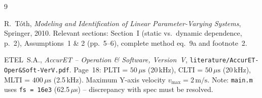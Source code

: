 \documentclass[11pt]{article}
\begin{document}
\begin{thebibliography}{9}

R.~Tóth,
\textit{Modeling and Identification of Linear Parameter-Varying Systems},
Springer, 2010.
Relevant sections: Section~I (static vs.\ dynamic dependence, p.~2),
Assumptions~1 \& 2 (pp.~5--6), complete method eq.~9a and footnote~2.

ETEL~S.A.,
\textit{AccurET -- Operation \& Software, Version~V},
\texttt{literature/AccurET-Oper\&Soft-VerV.pdf}.
Page~18: PLTI = $50\,\mu\text{s}$ (20\,kHz), CLTI = $50\,\mu\text{s}$ (20\,kHz),
MLTI = $400\,\mu\text{s}$ (2.5\,kHz). Maximum Y-axis velocity \(v_{\max} = 2\,\text{m/s}\).
Note: \texttt{main.m} uses \texttt{fs = 16e3} (62.5\,$\mu$s) -- discrepancy with spec
must be resolved.

\end{thebibliography}
\end{document}
